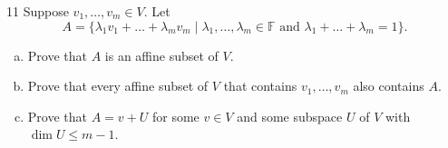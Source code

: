 \documentclass{extarticle}
\newenvironment{problem}[1]{\begin{prob*}{#1}{}}{\end{prob*}}
\newcommand{\F}{\mathbb{F}}
\begin{document}
\begin{problem}{11}
Suppose $v_1,\dots, v_m\in V$.  Let
\begin{equation*}
A = \{\lambda_1 v_1 + \dots + \lambda_m v_m\mid \lambda_1,\dots,\lambda_m\in\F\text{ and }\lambda_1 + \dots + \lambda_m = 1\}.
\end{equation*}
\begin{enumerate}[(a)]
\item Prove that $A$ is an affine subset of $V$.
\item Prove that every affine subset of $V$ that contains $v_1,\dots, v_m$ also contains $A$.
\item Prove that $A = v + U$ for some $v\in V$ and some subspace $U$ of $V$ with $\dim U\leq m - 1$.
\end{enumerate}
\end{problem}
\end{document}
